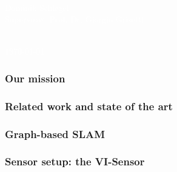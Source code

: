 \documentclass[11pt]{beamer}
\begin{document}
{
\begin{frame}
\vspace{-85pt}
\center{\Huge{\textcolor{white}{Online large-scale SLAM with stereo visual-inertial sensors}}}\\
\vspace{20pt}
\begin{minipage}{1.07\textwidth}
\textcolor{white}{\hfill\small{Dominik Schlegel}}\\
\textcolor{white}{\hfill\small{Supervisor: Prof. Dr. Giorgio Grisetti}}
\end{minipage}
\vspace{10pt}\\
\hspace{-25pt}\textcolor{white}{\small{\today}}
\end{frame}
}

\begin{frame}
\frametitle{Our mission}
\end{frame}

\begin{frame}
\frametitle{Related work and state of the art}
\end{frame}

\begin{frame}
\frametitle{Graph-based SLAM}
\end{frame}

\begin{frame}
\frametitle{Sensor setup: the VI-Sensor}
\end{frame}
\end{document}
